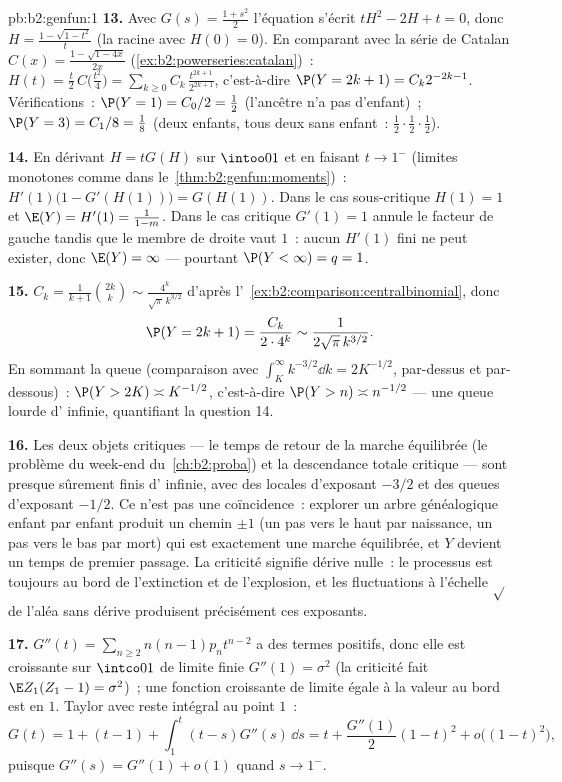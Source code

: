 \begin{solution}{pb:b2:genfun:1}
\textbf{13.} Avec $G(s) = \frac{1 + s^2}2$ l'équation s'écrit
$tH^2 - 2H + t = 0$, donc $H = \frac{1 - \sqrt{1 - t^2}}{t}$
(la racine avec $H(0) = 0$). En comparant avec la série de Catalan
$C(x) = \frac{1 - \sqrt{1 - 4x}}{2x}$
(\cref{ex:b2:powerseries:catalan})~: $H(t) = \frac
t2\,C\bigl(\frac{t^2}4\bigr) =
\sum_{k\geq0}C_k\,\frac{t^{2k+1}}{2^{2k+1}}$, c'est-à-dire $\P(Y =
2k+1) = C_k2^{-2k-1}$. Vérifications~: $\P(Y = 1) = C_0/2 = \frac12$
(l'ancêtre n'a pas d'enfant)~; $\P(Y = 3) = C_1/8 = \frac18$
(deux enfants, tous deux sans enfant~: $\frac12\cdot\frac12\cdot
\frac12$).

\textbf{14.} En dérivant $H = tG(H)$ sur $\intoo01$ et
en faisant $t \to 1^-$ (limites monotones comme dans
le~\cref{thm:b2:genfun:moments})~: $H'(1)\bigl(1 - G'(H(1))\bigr)
= G(H(1))$. Dans le cas sous-critique $H(1) = 1$ et $\E(Y) =
H'(1) = \frac1{1 - m}$. Dans le cas critique $G'(1) = 1$
annule le facteur de gauche tandis que le membre de droite vaut $1$~:
aucun $H'(1)$ fini ne peut exister, donc $\E(Y) = \infty$ --- pourtant
$\P(Y < \infty) = q = 1$.

\textbf{15.} $C_k = \frac1{k+1}\binom{2k}k \sim
\frac{4^k}{\sqrt\pi\,k^{3/2}}$ d'après
l'~\cref{ex:b2:comparison:centralbinomial}, donc
\[
\P(Y = 2k+1) = \frac{C_k}{2\cdot4^{k}} \sim
\frac1{2\sqrt\pi\,k^{3/2}} .
\]
En sommant la queue (comparaison avec $\int_K^\infty
k^{-3/2}\dd k = 2K^{-1/2}$, par-dessus et par-dessous)~: $\P(Y > 2K)
\asymp K^{-1/2}$, c'est-à-dire $\P(Y > n) \asymp n^{-1/2}$ --- une
queue lourde d' infinie, quantifiant la question 14.

\textbf{16.} Les deux objets critiques --- le temps de retour
de la marche équilibrée (le problème du week-end du~\cref{ch:b2:proba}) et
la descendance totale critique --- sont presque sûrement finis
d' infinie, avec des  locales d'exposant $-3/2$ et des
queues d'exposant $-1/2$. Ce n'est pas une coïncidence~: explorer un
arbre généalogique enfant par enfant produit un chemin $\pm1$ (un pas
vers le haut par naissance, un pas vers le bas par mort) qui est
exactement une marche équilibrée, et $Y$ devient un temps de premier
passage. La criticité signifie dérive nulle~: le processus est
toujours au bord de l'extinction et de l'explosion, et les
fluctuations à l'échelle $\sqrt{}$ de l'aléa sans dérive produisent
précisément ces exposants.

\textbf{17.} $G''(t) = \sum_{n\geq2}n(n-1)p_nt^{n-2}$ a des
termes positifs, donc elle est croissante sur $\intco01$ de limite
finie $G''(1) = \sigma^2$ (la criticité fait
$\E Z_1(Z_1 - 1) = \sigma^2$)~; une fonction croissante de
limite égale à la valeur au bord est  en $1$.
Taylor avec reste intégral au point $1$~:
\[
G(t) = 1 + (t - 1) + \int_1^t(t - s)G''(s)\,\dd s
= t + \frac{G''(1)}2(1-t)^2 + o\bigl((1-t)^2\bigr),
\]
puisque $G''(s) = G''(1) + o(1)$ quand $s \to 1^-$.


\end{solution}
